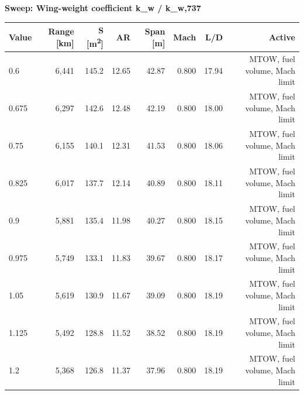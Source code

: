 \documentclass[10pt,a4paper]{article}
\begin{document}
\begin{table}[H]\centering\small
{\textbf{Sweep: Wing-weight coefficient  k\_w / k\_w,737}}\\[3pt]
\begin{tabular}{lrrrrrrr}
\toprule
\textbf{Value} & \textbf{Range [km]} & \textbf{S [m\textsuperscript{2}]} & \textbf{AR} & \textbf{Span [m]} & \textbf{Mach} & \textbf{L/D} & \textbf{Active} \\
\midrule
0.6 & 6,441 & 145.2 & 12.65 & 42.87 & 0.800 & 17.94 & MTOW, fuel volume, Mach limit \\
0.675 & 6,297 & 142.6 & 12.48 & 42.19 & 0.800 & 18.00 & MTOW, fuel volume, Mach limit \\
0.75 & 6,155 & 140.1 & 12.31 & 41.53 & 0.800 & 18.06 & MTOW, fuel volume, Mach limit \\
0.825 & 6,017 & 137.7 & 12.14 & 40.89 & 0.800 & 18.11 & MTOW, fuel volume, Mach limit \\
0.9 & 5,881 & 135.4 & 11.98 & 40.27 & 0.800 & 18.15 & MTOW, fuel volume, Mach limit \\
0.975 & 5,749 & 133.1 & 11.83 & 39.67 & 0.800 & 18.17 & MTOW, fuel volume, Mach limit \\
1.05 & 5,619 & 130.9 & 11.67 & 39.09 & 0.800 & 18.19 & MTOW, fuel volume, Mach limit \\
1.125 & 5,492 & 128.8 & 11.52 & 38.52 & 0.800 & 18.19 & MTOW, fuel volume, Mach limit \\
1.2 & 5,368 & 126.8 & 11.37 & 37.96 & 0.800 & 18.19 & MTOW, fuel volume, Mach limit \\
\bottomrule
\end{tabular}
\end{table}
\end{document}
